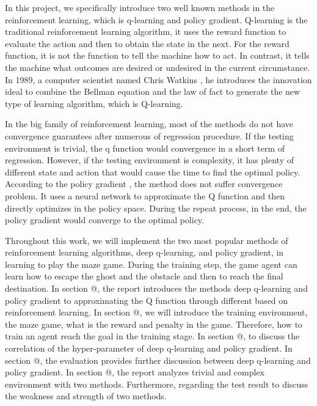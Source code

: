 \documentclass[article]{aaltoseries}
\makeatletter
\newcommand*{\rom}[1]{\expandafter\@slowromancap\romannumeral #1@}
\makeatother
\begin{document}
In this project, we specifically introduce two well known methods in the reinforcement learning, which is q-learning and policy gradient. Q-learning is the traditional reinforcement learning algorithm, it uses the reward function to evaluate the action and then to obtain the state in the next. For the reward function, it is not the function to tell the machine how to act. In contrast, it tells the machine what outcomes are desired or undesired in the current circumstance. In 1989, a computer scientist named Chris Watkins \cite{Watkins1992}, he introduces the innovation ideal to combine the Bellman equation and the law of fact to generate the new type of learning algorithm, which is Q-learning.

In the big family of reinforcement learning, most of the methods do not have convergence guarantees after numerous of regression procedure. If the testing environment is trivial, the q function would convergence in a short term of regression. However, if the testing environment is complexity, it has plenty of different state and action that would cause the time to find the optimal policy. According to the policy gradient \cite{Sutton:1999:PGM:3009657.3009806}, the method does not suffer convergence problem. It uses a neural network to approximate the Q function and then directly optimizes in the policy space. During the repeat process, in the end, the policy gradient would converge to the optimal policy.

Throughout this work, we will implement the two most popular methods of reinforcement learning algorithms, deep q-learning, and policy gradient, in learning to play the maze game. During the training step, the game agent can learn how to escape the ghost and the obstacle and then to reach the final destination. In section \rom{3}, the report introduces the methods deep q-learning and policy gradient \cite{mnih2015humanlevel} to approximating the Q function through different based on reinforcement learning. In section \rom{4}, we will introduce the training environment, the maze game, what is the reward and penalty in the game. Therefore, how to train an agent reach the goal in the training stage. In section \rom{5}, to discuss the correlation of the hyper-parameter of deep q-learning and policy gradient. In section \rom{6}, the evaluation provides further discussion between deep q-learning and policy gradient. In section \rom{7}, the report analyzes trivial and complex environment with two methods. Furthermore, regarding the test result to discuss the weakness and strength of two methods.
\end{document}
